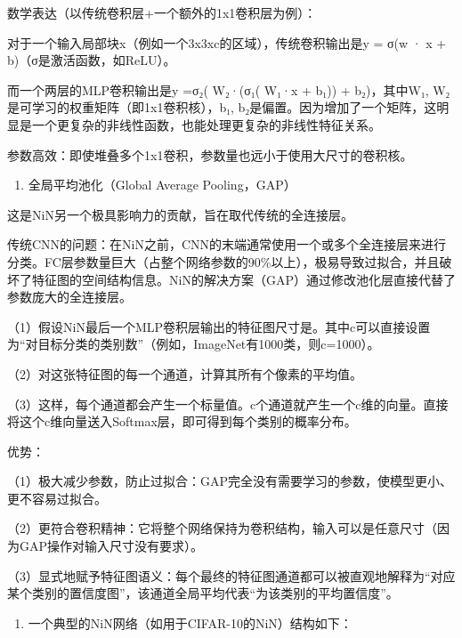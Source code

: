 数学表达（以传统卷积层+一个额外的1x1卷积层为例）：

对于一个输入局部块x（例如一个3x3xc的区域），传统卷积输出是y = σ(w · x + b)（σ是激活函数，如ReLU）。

而一个两层的MLP卷积输出是y =σ₂( W₂·(σ₁( W₁·x + b₁)) + b₂)，其中W₁, W₂是可学习的权重矩阵（即1x1卷积核），b₁, b₂是偏置。因为增加了一个矩阵，这明显是一个更复杂的非线性函数，也能处理更复杂的非线性特征关系。

参数高效：即使堆叠多个1x1卷积，参数量也远小于使用大尺寸的卷积核。

\begin{enumerate}
\def\labelenumi{\arabic{enumi}.}
\setcounter{enumi}{1}
\tightlist
\item
  全局平均池化（Global Average Pooling，GAP）
\end{enumerate}

这是NiN另一个极具影响力的贡献，旨在取代传统的全连接层。

传统CNN的问题：在NiN之前，CNN的末端通常使用一个或多个全连接层来进行分类。FC层参数量巨大（占整个网络参数的90\%以上），极易导致过拟合，并且破坏了特征图的空间结构信息。NiN的解决方案（GAP）通过修改池化层直接代替了参数庞大的全连接层。

（1）假设NiN最后一个MLP卷积层输出的特征图尺寸是。其中c可以直接设置为``对目标分类的类别数''（例如，ImageNet有1000类，则c=1000）。

（2）对这张特征图的每一个通道，计算其所有个像素的平均值。

（3）这样，每个通道都会产生一个标量值。c个通道就产生一个c维的向量。直接将这个c维向量送入Softmax层，即可得到每个类别的概率分布。

优势：

（1）极大减少参数，防止过拟合：GAP完全没有需要学习的参数，使模型更小、更不容易过拟合。

（2）更符合卷积精神：它将整个网络保持为卷积结构，输入可以是任意尺寸（因为GAP操作对输入尺寸没有要求）。

（3）显式地赋予特征图语义：每个最终的特征图通道都可以被直观地解释为``对应某个类别的置信度图''，该通道全局平均代表``为该类别的平均置信度''。

\begin{enumerate}
\def\labelenumi{\arabic{enumi}.}
\setcounter{enumi}{2}
\tightlist
\item
{}
  一个典型的NiN网络（如用于CIFAR-10的NiN）结构如下：
\end{enumerate}

